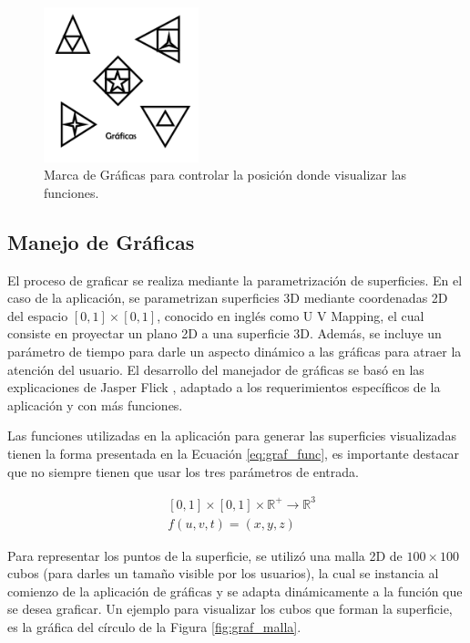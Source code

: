 \begin{figure}[hbt!]
\centering
\includegraphics[width=0.4\textwidth]{figuras/graficas/centro.png}
\caption{\label{fig:graf_centro}Marca de Gráficas para controlar la posición donde visualizar las funciones.}
\end{figure}
\FloatBarrier


\subsection{Manejo de Gráficas} 
El proceso de graficar se realiza mediante la parametrización de superficies. En el caso de la aplicación, se parametrizan superficies 3D mediante coordenadas 2D del espacio $[0,1]\times[0,1]$, conocido en inglés como U V Mapping, el cual consiste en proyectar un plano 2D a una superficie 3D. Además, se incluye un parámetro de tiempo para darle un aspecto dinámico a las gráficas para atraer la atención del usuario. El desarrollo del manejador de gráficas se basó en las explicaciones de Jasper Flick \cite{flick2017}, adaptado a los requerimientos específicos de la aplicación y con más funciones.

Las funciones utilizadas en la aplicación para generar las superficies visualizadas tienen la forma presentada en la Ecuación \ref{eq:graf_func}, es importante destacar que no siempre tienen que usar los tres parámetros de entrada.

\begin{equation}\label{eq:graf_func}
\begin{aligned}
    & [0,1]\times[0,1]\times\mathbb{R}^+ \rightarrow \mathbb{R}^3 \\
    & f(u,v,t) = (x,y,z)
\end{aligned}
\end{equation}

Para representar los puntos de la superficie, se utilizó una malla 2D de $100 \times 100$ cubos (para darles un tamaño visible por los usuarios), la cual se instancia al comienzo de la aplicación de gráficas y  se adapta dinámicamente a la función que se desea graficar. Un ejemplo para visualizar los cubos que forman la superficie, es la gráfica del círculo de la Figura \ref{fig:graf_malla}. 

